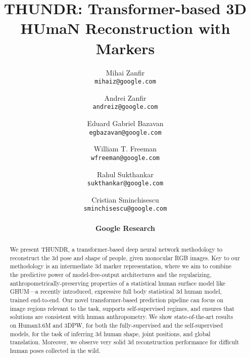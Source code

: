 \documentclass[10pt,twocolumn,letterpaper]{article}
\begin{document}
\title{THUNDR: Transformer-based 3D HUmaN  Reconstruction with Markers}

\author{Mihai Zanfir \\
  \texttt{mihaiz@google.com} \\
  \and
 Andrei Zanfir \\
  \texttt{andreiz@google.com} \\
\and
  Eduard Gabriel Bazavan \\
\texttt{egbazavan@google.com} \\
  \and
  William T. Freeman \\
  \texttt{wfreeman@google.com} \\
  \and
  Rahul Sukthankar \\
  \texttt{sukthankar@google.com} \\
  \and
  Cristian Sminchisescu \\
  \texttt{sminchisescu@google.com} \\
  \\
  {\bf \large Google Research}\\
}

\ificcvfinal\thispagestyle{empty}\fi

\begin{abstract}
We present THUNDR, a transformer-based deep neural network methodology to reconstruct the 3d pose and shape of people, given monocular RGB images. Key to our methodology is an intermediate 3d marker representation, where we aim to combine the predictive power of model-free-output architectures and the regularizing, anthropometrically-preserving properties of a statistical human surface model like GHUM---a recently introduced, expressive full body statistical 3d human model, trained end-to-end. Our novel transformer-based prediction pipeline can focus on image regions relevant to the task, supports self-supervised regimes, and ensures that solutions are consistent with human anthropometry. 
We show state-of-the-art results on Human3.6M and 3DPW, for both the fully-supervised and the self-supervised models, for the task of inferring 3d human shape, joint positions, and global translation. Moreover, we observe very solid 3d reconstruction performance for difficult human poses collected in the wild.
\end{abstract}
\end{document}
